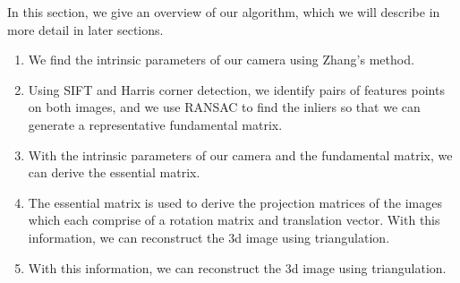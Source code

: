 \label{s:overview}

In this section, we give an overview of our algorithm, which we will describe in more detail
in later sections.

\begin{enumerate}
\item{We find the intrinsic parameters of our camera using Zhang's method.}
\item{Using SIFT and Harris corner detection, we identify pairs of features points on both images, and we use RANSAC to find the inliers so that we can generate a representative fundamental matrix.}
\item{With the intrinsic parameters of our camera and the fundamental matrix, we can derive the essential matrix.}
\item{The essential matrix is used to derive the projection matrices of the images which each comprise of a rotation matrix and translation vector. With this information, we can reconstruct the 3d image using triangulation.}
\item{With this information, we can reconstruct the 3d image using triangulation.}
\end{enumerate}
